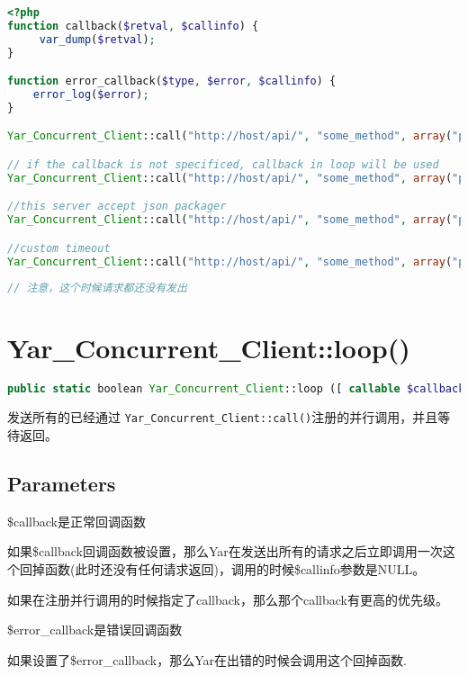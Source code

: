 \begin{lstlisting}[language=PHP]
<?php
function callback($retval, $callinfo) {
     var_dump($retval);
}

function error_callback($type, $error, $callinfo) {
    error_log($error);
}

Yar_Concurrent_Client::call("http://host/api/", "some_method", array("parameters"), "callback");

// if the callback is not specificed, callback in loop will be used
Yar_Concurrent_Client::call("http://host/api/", "some_method", array("parameters"));

//this server accept json packager                                                             
Yar_Concurrent_Client::call("http://host/api/", "some_method", array("parameters"), "callback", NULL, array(YAR_OPT_PACKAGER => "json"));

//custom timeout                                                                  
Yar_Concurrent_Client::call("http://host/api/", "some_method", array("parameters"), "callback", NULL, array(YAR_OPT_TIMEOUT=>1));
                                                                                
// 注意，这个时候请求都还没有发出
\end{lstlisting}


\section{Yar\_Concurrent\_Client::loop()}






\begin{lstlisting}[language=PHP]
public static boolean Yar_Concurrent_Client::loop ([ callable $callback [, callable $error_callback ]] )
\end{lstlisting}


发送所有的已经通过 \texttt{Yar\_Concurrent\_Client::call()}注册的并行调用，并且等待返回。

\subsection{Parameters}

\begin{compactitem}
\item \$callback是正常回调函数

如果\$callback回调函数被设置，那么Yar在发送出所有的请求之后立即调用一次这个回掉函数(此时还没有任何请求返回)，调用的时候\$callinfo参数是NULL。

如果在注册并行调用的时候指定了callback，那么那个callback有更高的优先级。

\item \$error\_callback是错误回调函数

如果设置了\$error\_callback，那么Yar在出错的时候会调用这个回掉函数.
\end{compactitem}



